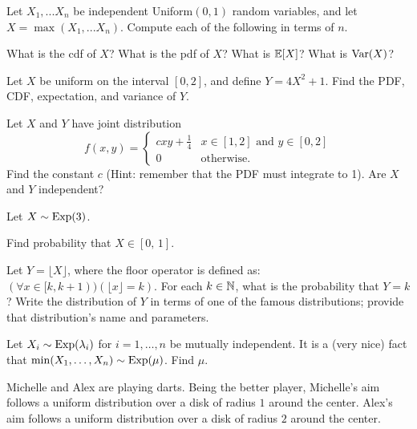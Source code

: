 \documentclass[11pt]{article}
\begin{document}
Let $X_1,...X_n$ be independent Uniform$(0,1)$ random variables, and let $X = 
\max(X_1,...X_n)$. Compute each of the following in terms of $n$.
\begin{Parts}
	\Part What is the cdf of $X$?
	\Part What is the pdf of $X$?
	\Part What is $\operatorname{\mathbb{E}}[X]$?
	\Part What is $\operatorname{Var}(X)$?
\end{Parts}


\begin{Parts}
    \Part Let $X$ be uniform on the interval $[0,2]$, and define $Y = 4X^2 + 1$. Find the PDF, CDF, expectation, and variance of $Y$.

    \Part Let $X$ and $Y$ have joint distribution 
    \[
        f(x,y) = \begin{cases}
            c x y + \frac{1}{4} & \text{$x \in [1,2]$ and $y \in [0,2]$} \\
            0 & \text{otherwise.}
        \end{cases}
    \]
    Find the constant $c$ (Hint: remember that the PDF must integrate to 1). Are $X$ and $Y$ independent?

    \Part Let $X \sim \operatorname{Exp}(3)$. 
    \begin{Parts}
    	\item Find probability that $X \in [0, \,1]$.
    	\item Let $Y = \lfloor X \rfloor$, where the floor operator is defined as:  $(\forall x \in [k, k+1))(\lfloor x \rfloor = k)$. For each $k \in \mathbb{N}$, what is the probability that $Y = k$? Write the distribution of $Y$ in terms of one of the famous distributions; provide that distribution's name and parameters.
    \end{Parts}

    \Part Let $X_i \sim \operatorname{Exp}(\lambda_i)$ for $i = 1,\ldots,n$ be mutually independent. It is a (very nice) fact that $\min(X_1,\ldots,X_n) \sim \operatorname{Exp}(\mu)$. Find $\mu$.
\end{Parts}


Michelle and Alex are playing darts.
Being the better player, Michelle's aim follows a uniform distribution over a disk of radius $1$ around the center. Alex's aim follows a uniform distribution over a disk of radius $2$ around the center. 
\end{document}
